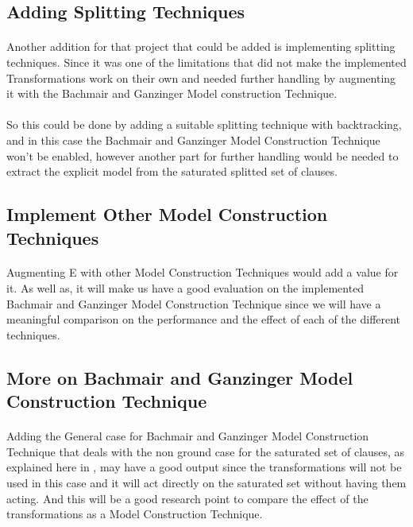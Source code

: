 		\subsection{Adding Splitting Techniques}\label{sub:c7s1s2}
			\paragraph{ }
			Another addition for that project that could be added is implementing splitting techniques. Since it was one of the limitations that did not make the implemented Transformations work on their own and needed further handling by augmenting it with the Bachmair and Ganzinger Model construction Technique.
			\paragraph{ }
			So this could be done by adding a suitable splitting technique with backtracking, and in this case the Bachmair and Ganzinger Model Construction Technique won't be enabled, however another part for further handling would be needed to extract the explicit model from the saturated splitted set of clauses.  

		\subsection{Implement Other Model Construction Techniques}\label{sub:c7s1s3}
			\paragraph{ }
			Augmenting E with other Model Construction Techniques would add a value for it. As well as, it will make us have a good evaluation on the implemented Bachmair and Ganzinger Model Construction Technique since we will have a meaningful comparison on the performance and the effect of each of the different techniques.
		
		\subsection{More on Bachmair and Ganzinger Model Construction Technique}\label{sub:c7s1s4}
			\paragraph{ }
			Adding the General case for Bachmair and Ganzinger Model Construction Technique that deals with the non ground %
		case for the saturated set of clauses, as explained here in \cite{BGMC}, may have a good output since the transformations will not be used in this case and it will act directly on the saturated set without having them acting. And this will be a good research point to compare the effect of the transformations as a Model Construction Technique.
		
